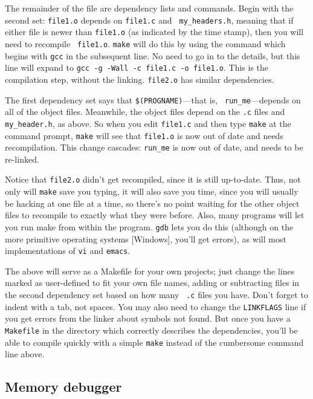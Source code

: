 \documentclass[12pt]{article}
\begin{document}
The remainder of the file are dependency lists and commands. Begin
with the second set: {\tt file1.o} depends on {\tt file1.c} and {\tt
my\_headers.h}, meaning that if either file is newer than {\tt file1.o}
(as indicated by the time stamp), then you will need to recompile {\tt
file1.o}. {\tt make} will do this by using the command which begins with
{\tt gcc} in the subsequent line. No need to go in to the details, but
this line will expand to {\tt gcc -g -Wall -c file1.c -o file1.o}. This
is the compilation step, without the linking. {\tt file2.o} has similar
dependencies.

The first dependency set says that {\tt \$(PROGNAME)}---that is, {\tt
run\_me}---depends on all of the object files. Meanwhile, the object files
depend on the {\tt .c} files and {\tt my\_header.h}, as above. So when
you edit {\tt file1.c} and then type {\tt make} at the command prompt,
{\tt make} will see that {\tt file1.o} is now out of date and needs
recompilation. This change cascades: {\tt run\_me} is now out of date,
and needs to be re-linked.

Notice that {\tt file2.o} didn't get recompiled, since it is still
up-to-date. Thus, not only will {\tt make} save you typing, it will also
save you time, since you will usually be hacking at one file at a time,
so there's no point waiting for the other object files to recompile
to exactly what they were before. Also, many programs will let you run
make from within the program. {\tt gdb} lets you do this (although on
the more primitive operating systems [Windows], you'll get errors),
as will most implementations of {\tt vi} and {\tt emacs}.

The above will serve as a Makefile for your own projects; just change
the lines marked as user-defined to fit your own file names, adding or
subtracting files in the second dependency set based on how many {\tt
.c} files you have. Don't forget to indent with a tab, not spaces. You
may also need to change the {\tt LINKFLAGS} line if you get errors from
the linker about symbols not found. But once you have a {\tt Makefile}
in the directory which correctly describes the dependencies, you'll
be able to compile quickly with a simple {\tt make} instead of the
cumbersome command line above.

\subsection{Memory debugger}  
 \label{valgrind}
\end{document}
